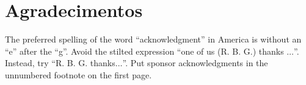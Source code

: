 \documentclass[conference]{IEEEtran}
\begin{document}
\section*{Agradecimentos}

The preferred spelling of the word ``acknowledgment'' in America is without 
an ``e'' after the ``g''. Avoid the stilted expression ``one of us (R. B. 
G.) thanks $\ldots$''. Instead, try ``R. B. G. thanks$\ldots$''. Put sponsor 
acknowledgments in the unnumbered footnote on the first page.



\end{document}
